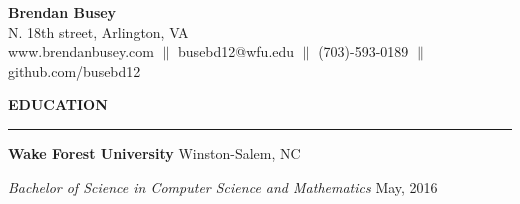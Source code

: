 \documentclass[executivepaper]{extarticle}
\begin{document}
\begin{center}

\thispagestyle{empty}

\resizebox{!}{4.3in}
{
\begin{minipage}{7.0in}


\begin{center}

\LARGE\textbf{\fontsize{14}{12}\selectfont Brendan Busey} \\
 
\fontsize{9}{8} N. 18th street, \fontsize{9}{8}\selectfont Arlington, VA \\

\fontsize {9}{8}\selectfont {\faDesktop} www.brendanbusey.com $\parallel$ \fontsize{9}{8}\selectfont {\faEnvelope} busebd12@wfu.edu $\parallel$ \fontsize{9}{8}\selectfont {\faPhone} (703)-593-0189 $\parallel$ \fontsize{9}{8}\selectfont {\faGithub} github.com/busebd12

\end{center}


\vspace{-1mm}

{\noindent \textbf{\fontsize{10}{9}\selectfont EDUCATION}}

\vspace{-3mm}

\noindent \rule{\textwidth}{0.5pt}

\vspace{-1mm}

{\noindent \textbf{\fontsize{9}{8}\selectfont Wake Forest University}} {\hfill \fontsize{8}{7}\selectfont Winston-Salem, NC}

\vspace{-1mm}

{\noindent \textit{\fontsize{9}{8}\selectfont Bachelor of Science in Computer Science and Mathematics}} {\hfill \fontsize{8}{7}\selectfont May, 2016}

\vspace{-1mm}

{}


\end{minipage}}
\end{center}
\end{document}

